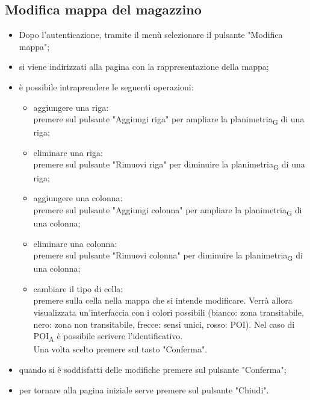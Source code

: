 \subsection{Modifica mappa del magazzino}
\begin{itemize}
    \item Dopo l'autenticazione, tramite il menù selezionare il pulsante "Modifica mappa";
    \item si viene indirizzati alla pagina con la rappresentazione della mappa;
    \item è possibile intraprendere le seguenti operazioni:
        \begin{itemize}
            \item aggiungere una riga: \\premere sul pulsante "Aggiungi riga" per ampliare la planimetria\textsubscript{G} di una riga;
            \item eliminare una riga: \\premere sul pulsante "Rimuovi riga" per diminuire la planimetria\textsubscript{G} di una riga;
            \item aggiungere una colonna: \\premere sul pulsante "Aggiungi colonna" per ampliare la planimetria\textsubscript{G} di una colonna;
            \item eliminare una colonna: \\premere sul pulsante "Rimuovi colonna" per diminuire la planimetria\textsubscript{G} di una colonna;
            \item cambiare il tipo di cella: \\premere sulla cella nella mappa che si intende modificare. Verrà allora visualizzata un'interfaccia con i colori possibili (bianco: zona transitabile, nero: zona non transitabile, frecce: sensi unici, rosso: POI). Nel caso di POI\textsubscript{A} è possibile scrivere l'identificativo. \\Una volta scelto premere sul tasto "Conferma".
        \end{itemize}
    \item quando si è soddisfatti delle modifiche premere sul pulsante "Conferma";
    \item per tornare alla pagina iniziale serve premere sul pulsante "Chiudi".
\end{itemize}

